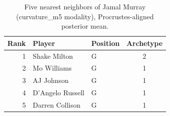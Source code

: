 \begin{table}[htbp]
  \centering\small
  \begin{tabular}{rllc}
    \toprule
    Rank & Player & Position & Archetype \\
    \midrule
    1 & Shake Milton & G & 2 \\
    2 & Mo Williams & G & 1 \\
    3 & AJ Johnson & G & 1 \\
    4 & D'Angelo Russell & G & 1 \\
    5 & Darren Collison & G & 1 \\
    \bottomrule
  \end{tabular}
  \caption{Five nearest neighbors of Jamal Murray (curvature_m5 modality), Procrustes-aligned posterior mean.}
  \label{tab:Jamal_Murray_neighbors_curvature_m5}
\end{table}

